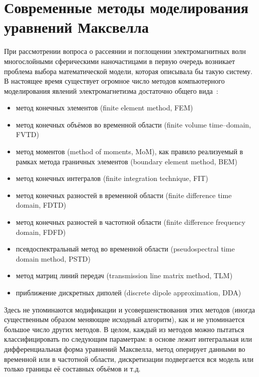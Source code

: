 \section{Современные методы моделирования уравнений Максвелла}
\label{sec:em-methods-intro}
При рассмотрении вопроса о рассеянии и поглощении электромагнитных
волн многослойными сферическими наночастицами в первую очередь
возникает проблема выбора математической модели, которая описывала бы
такую систему.  В настоящее время существует огромное число методов
компьютерного моделирования явлений электромагнетизма достаточно
общего
вида~\cite{Yu-PFDTD-2006,Inan-FDTD-2011,clemson,Bondenson-CEM-2005,Yu-Advanced-FDTD-2011}:
\begin{itemize}
\item метод конечных элементов (finite element method, FEM)
\item метод конечных объёмов во временной области (finite volume
  time--domain, FVTD)
\item метод моментов (method of moments, MoM), как правило реализуемый
  в рамках метода граничных элементов (boundary element method, BEM)
\item метод конечных интегралов (finite integration technique, FIT)
\item метод конечных разностей в временной области (finite difference
  time domain, FDTD)
\item метод конечных разностей в частотной области (finite difference
  frequency domain, FDFD)
\item псевдоспектральный метод во временной области (pseudospectral
  time domain method, PSTD)
\item метод матриц линий передач (transmission line matrix method,
  TLM)
\item приближение дискретных диполей (discrete dipole approximation, DDA)
\end{itemize}
Здесь не упоминаются модификации и усовершенствования этих методов
(иногда существенным образом меняющие исходный алгоритм), как и не
упоминается большое число других методов.  В целом, каждый из методов
можно пытаться классифицировать по следующим параметрам: в основе лежит
интегральная или дифференциальная форма уравнений Максвелла, метод
оперирует данными во временной или в частотной области, дискретизации
подвергается вся модель или только границы её составных объёмов и т.д.

